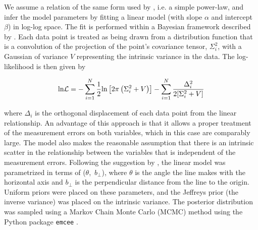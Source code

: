 We assume a relation of the same form used by \citet{greene05b}, i.e. a simple power-law, and infer the model parameters by fitting a linear model (with slope $\alpha$ and intercept $\beta$) in log-log space.
The fit is performed within a Bayesian framework described by \citet{hogg10}. 
Each data point is treated as being drawn from a distribution function that is a convolution of the projection of the point's covariance tensor, $\Sigma_i^2$, with a Gaussian of variance $V$ representing the intrinsic variance in the data.
The log-likelihood is then given by 

\begingroup\makeatletter{}\check@mathfonts
\begin{eqnarray}
  \text{ln} {\cal L} = - \sum_{i=1}^N \frac{1}{2} \text{ln}\left[2\pi\left(\Sigma_i^2 + V\right)\right] - \sum_{i=1}^N \frac{\Delta_i^2}{2[\Sigma_i^2 + V]} 
\end{eqnarray}
\endgroup

\noindent where $\Delta_i$ is the orthogonal displacement of each data point from the linear relationship. 
An advantage of this approach is that it allows a proper treatment of the measurement errors on both variables, which in this case are comparably large.
The model also makes the reasonable assumption that there is an intrinsic scatter in the relationship between the variables that is independent of the measurement errors.  
Following the suggestion by \citet{hogg10}, the linear model was parametrized in terms of ($\theta$,~$b_\bot$), where $\theta$ is the angle the line makes with the horizontal axis and $b_\bot$ is the perpendicular distance from the line to the origin.
Uniform priors were placed on these parameters, and the Jeffreys prior (the inverse variance) was placed on the intrinsic variance. 
The posterior distribution was sampled using a Markov Chain Monte Carlo (MCMC) method using the Python package {\tt emcee} \citep{foreman13}. 

